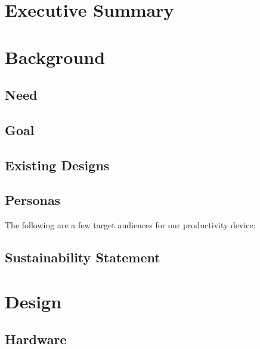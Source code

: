 \documentclass{article}
\begin{document}
\maketitle
\newpage

\section{Executive Summary}




\newpage
\tableofcontents
\newpage

\section{Background}
\subsection{Need}

\subsection{Goal}


\subsection{Existing Designs}

\pagebreak

\subsection{Personas}
The following are a few target audiences for our productivity device:






\subsection{Sustainability Statement}

\pagebreak

\section{Design}
\subsection{Hardware}


\pagebreak
\end{document}
